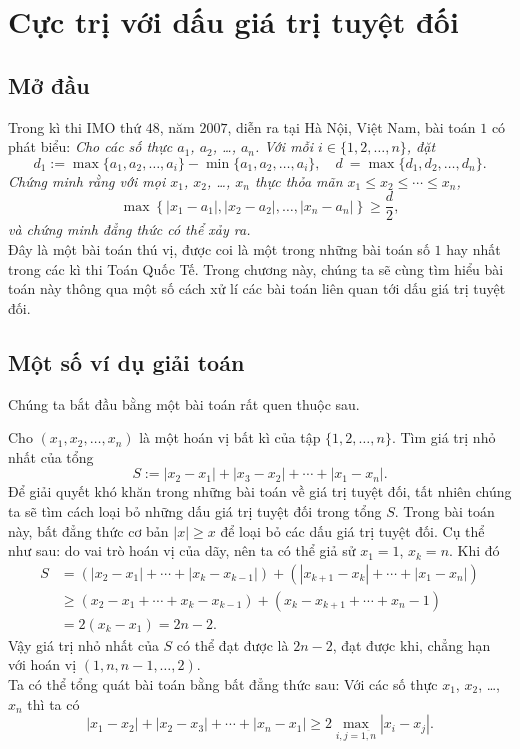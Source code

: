 
	
\section{Cực trị với dấu giá trị tuyệt đối}
\subsection{Mở đầu}	
\noindent Trong kì thi IMO thứ $48$, năm $2007$, diễn ra tại Hà Nội, Việt Nam, bài toán $1$ có phát biểu: \textit{Cho các số thực $a_1$, $a_2$, \ldots, $a_n$. Với mỗi $i\in \{1,2,\ldots,n \}$, đặt}
\[ d_1:=\max\{a_1,a_2,\ldots, a_i\}-\min\{a_1,a_2,\ldots,a_i \} ,\quad d\:=\max\{d_1,d_2,\ldots,d_n\}.\]
\textit{Chứng minh rằng với mọi $x_1$, $x_2$, \ldots, $x_n$ thực thỏa mãn $x_1\le x_2\le \cdots \le x_n$,}
\[ \max\left\{ |x_1-a_1|,|x_2-a_2|,\ldots,|x_n-a_n| \right\} \ge\dfrac{d}{2}, \]
\textit{và chứng minh đẳng thức có thể xảy ra.}\\
Đây là một bài toán thú vị, được coi là một trong những bài toán số $1$ hay nhất trong các kì thi Toán Quốc Tế. Trong chương này, chúng ta sẽ cùng tìm hiểu bài toán này thông qua một số cách xử lí các bài toán liên quan tới dấu giá trị tuyệt đối.

\subsection{Một số ví dụ giải toán}
\noindent Chúng ta bắt đầu bằng một bài toán rất quen thuộc sau.
\begin{vd}%
Cho $(x_1, x_2,\dots, x_n)$ là một hoán vị bất kì của tập $\{1,2,\dots,n\}$. Tìm giá trị nhỏ nhất của tổng
\[ S:=|x_2-x_1|+|x_3-x_2|+\cdots +|x_1-x_n|. \]
\loigiai
{Để giải quyết khó khăn trong những bài toán về giá trị tuyệt đối, tất nhiên chúng ta sẽ tìm cách loại bỏ những dấu giá trị tuyệt đối trong tổng $S$. Trong bài toán này, bất đẳng thức cơ bản $|x|\ge x$ để loại bỏ các dấu giá trị tuyệt đối. Cụ thể như sau: do vai trò hoán vị của dãy, nên ta có thể giả sử $x_1=1$, $x_k=n$. Khi đó
	\begin{align*}
		S&=\left(|x_2-x_1|+\cdots + |x_k-x_{k-1}|\right)+ \left(|x_{k+1}-x_k| +\cdots + |x_1-x_n|\right)\\
		&\ge\left(x_2-x_1 + \cdots + x_k- x_{k-1}\right) + \left( x_k-x_{k+1}+\cdots +x_n-1 \right)\\
		&=2(x_k-x_1)=2n-2.
	\end{align*} 
 Vậy giá trị nhỏ nhất của $S$ có thể đạt được là $2n-2$, đạt được khi, chẳng hạn với hoán vị $(1,n,n-1, \dots,2)$.\\
 Ta có thể tổng quát bài toán bằng bất đẳng thức sau: Với các số thực $x_1$, $x_2$, \dots, $x_n$ thì ta có
\[ |x_1-x_2|+ |x_2-x_3|+\cdots + |x_n-x_1|\ge 2\max\limits_{i,j=\overline{1,n}} |x_i-x_j|.\]
}
\end{vd}

